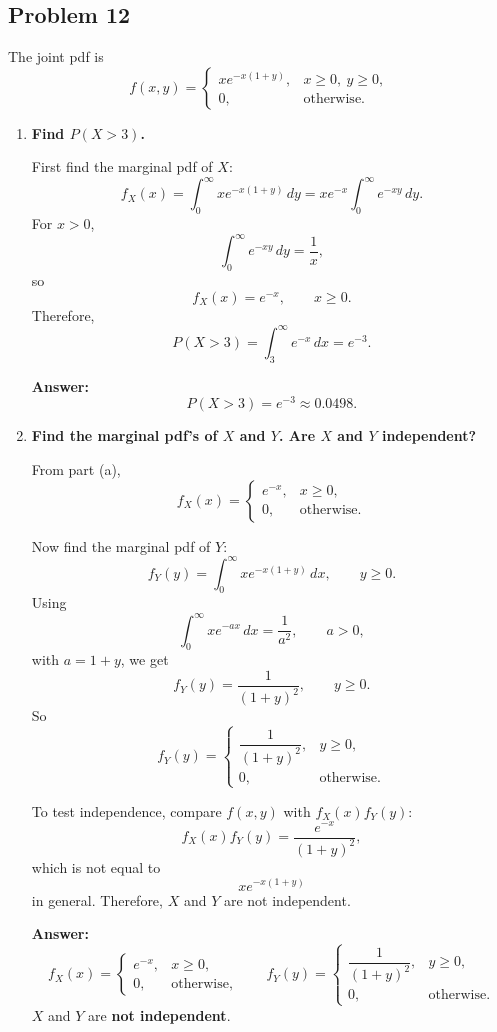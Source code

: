 \subsection*{Problem 12}

The joint pdf is
\[
f(x,y)=
\begin{cases}
x e^{-x(1+y)}, & x\ge 0,\ y\ge 0,\\
0, & \text{otherwise}.
\end{cases}
\]

\begin{enumerate}
    \item[(a)] \textbf{Find $P(X>3)$.}

    First find the marginal pdf of $X$:
    \[
    f_X(x)=\int_0^\infty x e^{-x(1+y)}\,dy
    =x e^{-x}\int_0^\infty e^{-xy}\,dy.
    \]
    For $x>0$,
    \[
    \int_0^\infty e^{-xy}\,dy=\frac{1}{x},
    \]
    so
    \[
    f_X(x)=e^{-x}, \qquad x\ge 0.
    \]
    Therefore,
    \[
    P(X>3)=\int_3^\infty e^{-x}\,dx=e^{-3}.
    \]

    \textbf{Answer:}
    \[
    P(X>3)=e^{-3}\approx 0.0498.
    \]

    \item[(b)] \textbf{Find the marginal pdf's of $X$ and $Y$. Are $X$ and $Y$ independent?}

    From part (a),
    \[
    f_X(x)=
    \begin{cases}
    e^{-x}, & x\ge 0,\\
    0, & \text{otherwise}.
    \end{cases}
    \]

    Now find the marginal pdf of $Y$:
    \[
    f_Y(y)=\int_0^\infty x e^{-x(1+y)}\,dx, \qquad y\ge 0.
    \]
    Using
    \[
    \int_0^\infty x e^{-ax}\,dx=\frac{1}{a^2}, \qquad a>0,
    \]
    with $a=1+y$, we get
    \[
    f_Y(y)=\frac{1}{(1+y)^2}, \qquad y\ge 0.
    \]
    So
    \[
    f_Y(y)=
    \begin{cases}
    \dfrac{1}{(1+y)^2}, & y\ge 0,\\
    0, & \text{otherwise}.
    \end{cases}
    \]

    To test independence, compare $f(x,y)$ with $f_X(x)f_Y(y)$:
    \[
    f_X(x)f_Y(y)=\frac{e^{-x}}{(1+y)^2},
    \]
    which is not equal to
    \[
    x e^{-x(1+y)}
    \]
    in general. Therefore, $X$ and $Y$ are not independent.

    \textbf{Answer:}
    \[
    f_X(x)=
    \begin{cases}
    e^{-x}, & x\ge 0,\\
    0, & \text{otherwise},
    \end{cases}
    \qquad
    f_Y(y)=
    \begin{cases}
    \dfrac{1}{(1+y)^2}, & y\ge 0,\\
    0, & \text{otherwise}.
    \end{cases}
    \]
    $X$ and $Y$ are \textbf{not independent}.


\end{enumerate}
